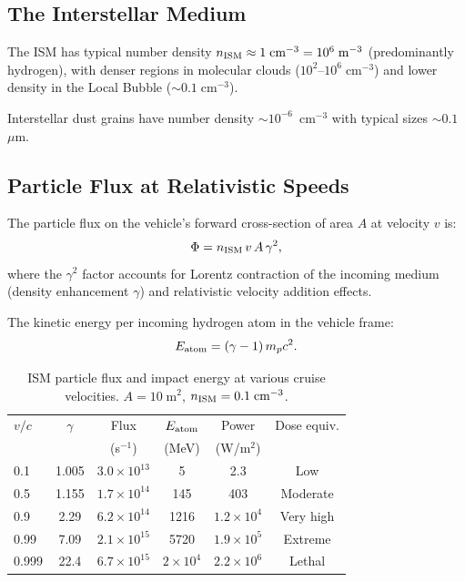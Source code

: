 \documentclass[aps,prd,twocolumn,superscriptaddress,nofootinbib]{revtex4-2}
\newcommand{\ee}[1]{\times 10^{#1}}
\begin{document}
\subsection{The Interstellar Medium}

The ISM has typical number density $n_{\rm ISM} \approx
1\;\text{cm}^{-3} = 10^6\;\text{m}^{-3}$ (predominantly hydrogen),
with denser regions in molecular clouds ($10^2$--$10^6\;\text{cm}^{-3}$)
and lower density in the Local Bubble ($\sim 0.1\;\text{cm}^{-3}$).

Interstellar dust grains have number density $\sim 10^{-6}$~cm$^{-3}$
with typical sizes $\sim 0.1$~$\mu$m.

\subsection{Particle Flux at Relativistic Speeds}

The particle flux on the vehicle's forward cross-section of area $A$
at velocity $v$ is:
\begin{equation}
\Phi = n_{\rm ISM}\,v\,A\,\gamma^2,
\end{equation}
where the $\gamma^2$ factor accounts for Lorentz contraction of the
incoming medium (density enhancement $\gamma$) and relativistic
velocity addition effects.

The kinetic energy per incoming hydrogen atom in the vehicle frame:
\begin{equation}
E_{\rm atom} = (\gamma - 1)\,m_p c^2.
\end{equation}

\begin{table}[H]
\centering
\caption{ISM particle flux and impact energy at various cruise
velocities.  $A = 10\;\text{m}^2$, $n_{\rm ISM} = 0.1\;\text{cm}^{-3}$.}
\label{tab:ism-flux}
\begin{tabular}{lccccc}
\toprule
$v/c$ & $\gamma$ & Flux & $E_{\rm atom}$ & Power & Dose equiv. \\
 & & (s$^{-1}$) & (MeV) & (W/m$^2$) & \\
\midrule
0.1 & 1.005 & $3.0\ee{13}$ & 5 & 2.3 & Low \\
0.5 & 1.155 & $1.7\ee{14}$ & 145 & 403 & Moderate \\
0.9 & 2.29  & $6.2\ee{14}$ & 1216 & $1.2\ee{4}$ & Very high \\
0.99 & 7.09 & $2.1\ee{15}$ & 5720 & $1.9\ee{5}$ & Extreme \\
0.999 & 22.4 & $6.7\ee{15}$ & $2\ee{4}$ & $2.2\ee{6}$ & Lethal \\
\bottomrule
\end{tabular}
\end{table}
\end{document}
